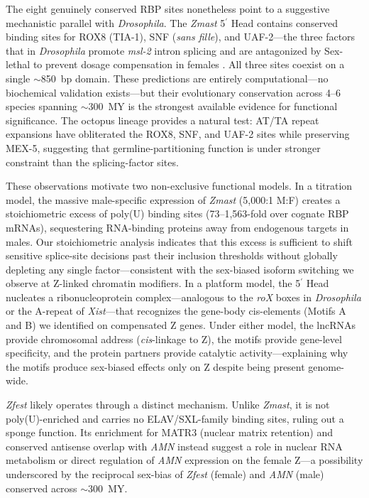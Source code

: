\documentclass[12pt]{article}
\newcommand{\citep}{\parencite}
\begin{document}
The eight genuinely conserved RBP sites nonetheless point
to a suggestive mechanistic parallel with \textit{Drosophila}.
The \textit{Zmast} 5$^\prime$ Head contains conserved binding sites
for ROX8 (TIA-1), SNF (\textit{sans fille}), and UAF-2---the
three factors that in \textit{Drosophila} promote \textit{msl-2} intron splicing
and are antagonized by Sex-lethal to prevent dosage compensation
in females \citep{forch2001modulation, cline1999snf, merendino1999inhibition}.
All three sites coexist on a single $\sim$850~bp domain.
These predictions are entirely computational---no biochemical validation exists---but
their evolutionary conservation across 4--6 species
spanning $\sim$300~MY is the strongest available evidence
for functional significance.
The octopus lineage provides a natural test:
AT/TA repeat expansions have obliterated the ROX8, SNF, and UAF-2 sites
while preserving MEX-5, suggesting that germline-partitioning function
is under stronger constraint than the splicing-factor sites.

These observations motivate two non-exclusive functional models.
In a titration model, the massive male-specific expression
of \textit{Zmast} (5,000:1 M:F) creates a stoichiometric excess
of poly(U) binding sites (73--1,563-fold over cognate RBP mRNAs),
sequestering RNA-binding proteins away from endogenous targets in males.
Our stoichiometric analysis indicates that this excess
is sufficient to shift sensitive splice-site decisions
past their inclusion thresholds
without globally depleting any single factor---consistent
with the sex-biased isoform switching we observe
at Z-linked chromatin modifiers.
In a platform model, the 5$^\prime$ Head nucleates
a ribonucleoprotein complex---analogous to the \textit{roX} boxes
in \textit{Drosophila} or the A-repeat of \textit{Xist}---that
recognizes the gene-body cis-elements (Motifs A and B)
we identified on compensated Z genes.
Under either model, the lncRNAs provide chromosomal address
(\textit{cis}-linkage to Z),
the motifs provide gene-level specificity,
and the protein partners provide catalytic activity---explaining
why the motifs produce sex-biased effects only on Z
despite being present genome-wide.

\textit{Zfest} likely operates through a distinct mechanism.
Unlike \textit{Zmast}, it is not poly(U)-enriched
and carries no ELAV/SXL-family binding sites,
ruling out a sponge function.
Its enrichment for MATR3 (nuclear matrix retention)
and conserved antisense overlap with \textit{AMN}
instead suggest a role in nuclear RNA metabolism
or direct regulation of \textit{AMN} expression on the female Z---a
possibility underscored by the reciprocal sex-bias
of \textit{Zfest} (female) and \textit{AMN} (male)
conserved across $\sim$300~MY.
\end{document}
